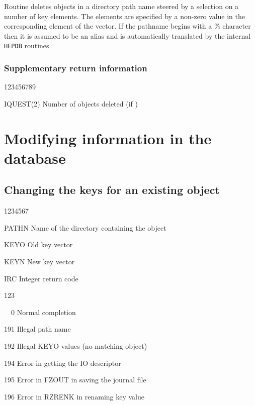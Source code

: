Routine  deletes objects in a directory path name steered by
a selection on a number of key elements. The elements are specified
by a non-zero value in the corresponding element of the  vector.
If the pathname begins with a \% character then it is assumed to be
an alias and is automatically translated by the internal {\tt HEPDB}
routines.

\subsubsection*{Supplementary return information}

\begin{DLtt}{123456789}
\item[IQUEST(2)]Number of objects deleted (if )
%
\end{DLtt}


\section{Modifying information in the database}

\subsection{Changing the keys for an existing object}
\begin{DLtt}{1234567}
\item[PATHN]Name of the directory containing the object
\item[KEYO]Old key vector
\item[KEYN]New key vector
\item[IRC]Integer return code
  \begin{DLtt}{123}
    \item[\ \ 0]Normal completion
    \item[191]Illegal path name                               
    \item[192]Illegal KEYO values (no matching object)
    \item[194]Error in getting the IO descriptor     
    \item[195]Error in FZOUT in saving the journal file
    \item[196]Error in RZRENK in renaming key value
  \end{DLtt}
\end{DLtt}

